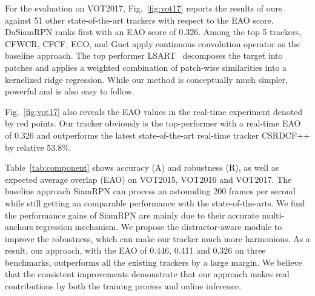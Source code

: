 \documentclass[runningheads]{llncs}
\begin{document}
For the evaluation on VOT2017, Fig.~\ref{fig:vot17} reports the results of ours against 51 other state-of-the-art trackers with respect to the EAO score. DaSiamRPN ranks first with an EAO score of 0.326. Among the top 5 trackers, CFWCR, CFCF, ECO, and Gnet apply continuous convolution operator as the baseline approach. The top performer LSART~\cite{LSART} decomposes the target into patches and applies a weighted combination of patch-wise similarities into a kernelized ridge regression. While our method is conceptually much simpler, powerful and is also easy to follow.

Fig.~\ref{fig:vot17} also reveals the EAO values in the real-time experiment denoted by red points. Our tracker obviously is the top-performer with a real-time EAO of 0.326 and outperforms the latest state-of-the-art real-time tracker CSRDCF++ by relative 53.8\%.

Table~\ref{tab:component} shows accuracy (A) and robustness (R), as well as expected average overlap (EAO) on VOT2015, VOT2016 and VOT2017.
The baseline approach SiamRPN can process an astounding 200 frames per second while still getting an comparable performance with the state-of-the-arts.
We find the performance gains of SiamRPN are mainly due to their accurate multi-anchors regression mechanism. We propose the distractor-aware module to improve the robustness, which can make our tracker much more harmonious.
As a result, our approach, with the EAO of 0.446, 0.411 and 0.326 on three benchmarks, outperforms all the existing trackers by a large margin.
We believe that the consistent improvements demonstrate that our approach makes real contributions by both the training process and online inference.
\end{document}
